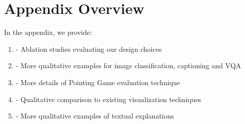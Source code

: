 
\section{Appendix Overview}

In the appendix, we provide:
 \begin{enumerate}[I]
\setlength{\itemsep}{1pt}
  \setlength{\parskip}{0pt}
  \setlength{\parsep}{0pt}
 \item - Ablation studies evaluating our design choices
 \item - More qualitative examples for image classification, captioning and VQA
 \item - More details of Pointing Game evaluation technique
 \item - Qualitative comparison to existing visualization techniques
 \item - More qualitative examples of textual explanations
 \end{enumerate}



